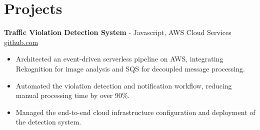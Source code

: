 \documentclass[11pt]{article}       %
\begin{document}

\vspace{-18.5pt}

\section*{Projects}

\textbf{Traffic Violation Detection System}{ - Javascript, AWS Cloud Services} \hfill \href{https://github.com/Monica20030707/AWS_rekonigition-N-read-database}{github.com} \\
\vspace{-9pt}
\begin{itemize}
  \item Architected an event-driven serverless pipeline on AWS, integrating Rekognition for image analysis and SQS for decoupled message processing.
  \item Automated the violation detection and notification workflow, reducing manual processing time by over 90\%.
  \item Managed the end-to-end cloud infrastructure configuration and deployment of the detection system.
\end{itemize}

\end{document}
